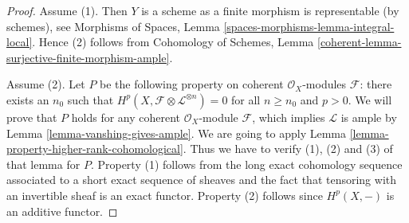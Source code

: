 \documentclass{stacks-project}
\theoremstyle{plain}
\theoremstyle{definition}
\theoremstyle{remark}
\numberwithin{equation}{subsection}
\begin{document}
\begin{proof}
Assume (1). Then $Y$ is a scheme as a finite morphism is representable
(by schemes), see Morphisms of Spaces, Lemma
\ref{spaces-morphisms-lemma-integral-local}. Hence (2)
follows from Cohomology of Schemes, Lemma
\ref{coherent-lemma-surjective-finite-morphism-ample}.

\medskip\noindent
Assume (2). Let $P$ be the following property on
coherent $\mathcal{O}_X$-modules $\mathcal{F}$: there exists an $n_0$
such that $H^p(X, \mathcal{F} \otimes \mathcal{L}^{\otimes n}) = 0$
for all $n \geq n_0$ and $p > 0$. We will prove that $P$ holds
for any coherent $\mathcal{O}_X$-module $\mathcal{F}$, which implies
$\mathcal{L}$ is ample by Lemma \ref{lemma-vanshing-gives-ample}.
We are going to apply Lemma \ref{lemma-property-higher-rank-cohomological}.
Thus we have to verify (1), (2) and (3) of that lemma for $P$.
Property (1) follows from the long exact cohomology sequence associated
to a short exact sequence of sheaves and the fact that tensoring with
an invertible sheaf is an exact functor. Property (2) follows since
$H^p(X, -)$ is an additive functor.


\end{proof}
\end{document}
